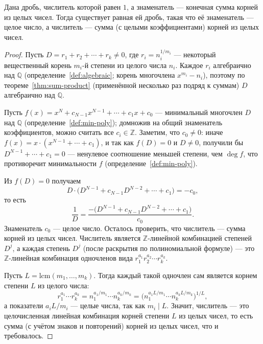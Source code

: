 \documentclass[12pt]{article}
\begin{document}
    \begin{theorem}\label{thm:rationalize}
    	Дана дробь, числитель которой равен $1$, а знаменатель --- конечная сумма корней из целых чисел. Тогда существует равная ей дробь, такая что её знаменатель --- целое число, а числитель --- сумма (с целыми коэффициентами) корней из целых чисел.
    \end{theorem}
    \begin{proof}
    	Пусть $D = r_1 + r_2 + \cdots + r_k \ne 0$, где $r_i = n_i^{1/m_i}$ --- некоторый вещественный корень $m_i$-й степени из целого числа $n_i$. Каждое $r_i$ алгебраично над $\mathbb{Q}$ (определение~\ref{def:algebraic}; корень многочлена $x^{m_i}-n_i$), поэтому по теореме~\ref{thm:sum-product} (применённой несколько раз подряд к суммам) $D$ алгебраично над $\mathbb{Q}$.
    
    	Пусть $f(x) = x^N + c_{N-1}x^{N-1} + \cdots + c_1 x + c_0$ --- минимальный многочлен $D$ над $\mathbb{Q}$ (определение~\ref{def:min-poly}); домножив на общий знаменатель коэффициентов, можно считать все $c_i \in \mathbb{Z}$. Заметим, что $c_0 \ne 0$: иначе $f(x) = x\cdot(x^{N-1}+\cdots+c_1)$, и так как $f(D)=0$ и $D\ne 0$, получили бы $D^{N-1}+\cdots+c_1=0$ --- ненулевое соотношение меньшей степени, чем $\deg f$, что противоречит минимальности $f$ (определение~\ref{def:min-poly}).
    
    	Из $f(D)=0$ получаем
    	\[
    	D\cdot\big(D^{N-1}+c_{N-1}D^{N-2}+\cdots+c_1\big) = -c_0,
    	\]
    	то есть
    	\[
    	\frac{1}{D} = \frac{-\big(D^{N-1}+c_{N-1}D^{N-2}+\cdots+c_1\big)}{c_0}.
    	\]
    	Знаменатель $c_0$ --- целое число. Осталось проверить, что числитель --- сумма корней из целых чисел. Числитель является $\mathbb{Z}$-линейной комбинацией степеней $D^j$, а каждая степень $D^j$ (после раскрытия по полиномиальной формуле) --- это $\mathbb{Z}$-линейная комбинация одночленов вида $r_1^{a_1}r_2^{a_2}\cdots r_k^{a_k}$.
    
    	Пусть $L = \mathrm{lcm}(m_1,\ldots,m_k)$. Тогда каждый такой одночлен сам является корнем степени $L$ из целого числа:
    	\[
    	r_1^{a_1}\cdots r_k^{a_k} = n_1^{a_1/m_1}\cdots n_k^{a_k/m_k} = \Big(n_1^{a_1 L/m_1}\cdots n_k^{a_k L/m_k}\Big)^{1/L},
    	\]
    	а показатели $a_iL/m_i$ --- целые числа, так как $m_i \mid L$. Значит, числитель --- это целочисленная линейная комбинация корней степени $L$ из целых чисел, то есть сумма (с учётом знаков и повторений) корней из целых чисел, что и требовалось.
    \end{proof}
    
\end{document}
